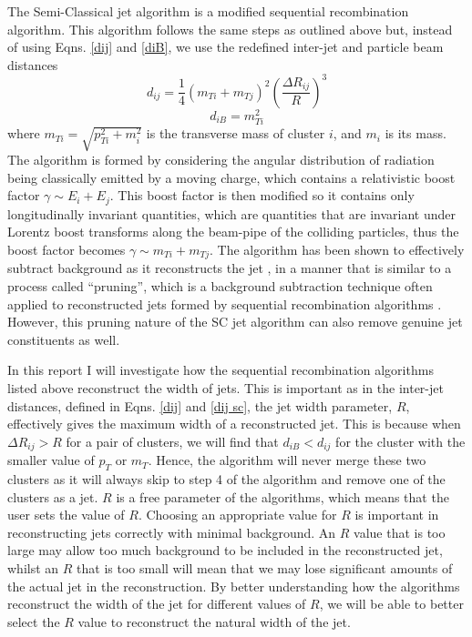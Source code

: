 \documentclass[a4paper,11pt, onecolumn]{article}
\begin{document}
 The Semi-Classical jet algorithm \cite{sc} is a modified sequential recombination algorithm. This algorithm follows the same steps as outlined
 above but, instead of using Eqns. \eqref{dij} and \eqref{diB}, we use the redefined inter-jet and particle beam distances
 \begin{equation}
   d_{ij} = \frac{1}{4} (m_{Ti} + m_{Tj})^2 \left( \frac{\Delta R_{ij}}{R} \right) ^3 \label{dij sc}
 \end{equation}
 \begin{equation}
   d_{iB} = m_{Ti}^2 \label{diB sc}
  \end{equation}
  where $m_{Ti} = \sqrt{p_{Ti}^2 + m_i^2}$ is the transverse mass of cluster $i$, and $m_i$ is its mass. The algorithm is formed by considering the angular distribution
  of radiation being  classically emitted by a moving charge, which contains a relativistic boost factor $\gamma \sim E_i + E_j$. This boost factor is then modified so it
  contains only longitudinally invariant quantities, which are quantities that are invariant under Lorentz boost transforms along the beam-pipe of the
  colliding particles, thus the boost factor becomes $\gamma \sim m_{Ti} + m_{Tj}$. The algorithm has been shown to effectively subtract background as it reconstructs the jet \cite{sc},
  in a manner that is similar to a process called ``pruning'', which is a background subtraction technique often applied to reconstructed jets formed by sequential 
  recombination algorithms \cite{pruning}. However, this pruning nature of the SC jet algorithm can also remove genuine jet constituents as well.  
  \newline

  In this report I will investigate how the sequential recombination algorithms listed above reconstruct the width of jets. This is important as in 
  the inter-jet distances, defined in Eqns. \eqref{dij} and \eqref{dij sc}, the jet width parameter, $R$, effectively gives the maximum width of a reconstructed jet.
  This is because when $\Delta R_{ij} > R$ for a pair of clusters, we will find that $d_{iB} < d_{ij}$ for the cluster with the smaller value of ${p_T}$ or ${m_T}$.
  Hence, the algorithm will never merge these two clusters as it will always skip to step 4 of the algorithm and remove one of the clusters as a jet. $R$
  is a free parameter of the algorithms, which means that the user sets the value of $R$. Choosing an appropriate value for $R$ 
  is important in reconstructing jets correctly with minimal background. An $R$ value 
  that is too large may allow too much background to be included in the reconstructed jet, whilst an $R$ that is too small will mean that we may lose
  significant amounts of the actual jet in the reconstruction. By better understanding how the algorithms reconstruct the width of the jet for different values of $R$,
  we will be able to better select the $R$ value to reconstruct the natural width of the jet.
  \newline
\end{document}
